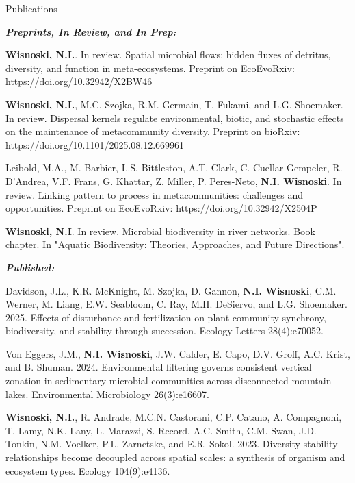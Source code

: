\documentclass{resume} %
\begin{document}
\begin{rSection}{Publications}

{\bf \em Preprints, In Review, and In Prep:}
\begin{etaremune}

\item {\bf Wisnoski, N.I.}. In review. Spatial microbial flows: hidden fluxes of detritus, diversity, and function in meta-ecosystems. Preprint on EcoEvoRxiv: https://doi.org/10.32942/X2BW46 

\item {\bf Wisnoski, N.I.}, M.C. Szojka, R.M. Germain, T. Fukami, and L.G. Shoemaker. In review. Dispersal kernels regulate environmental, biotic, and stochastic effects on the maintenance of metacommunity diversity. Preprint on bioRxiv: https://doi.org/10.1101/2025.08.12.669961 

\item Leibold, M.A., M. Barbier, L.S. Bittleston, A.T. Clark, C. Cuellar-Gempeler, R. D'Andrea, V.F. Frans, G. Khattar, Z. Miller, P. Peres-Neto, {\bf N.I. Wisnoski}. In review. Linking pattern to process in metacommunities: challenges and opportunities. Preprint on EcoEvoRxiv: https://doi.org/10.32942/X2504P 

\item {\bf Wisnoski, N.I}. In review. Microbial biodiversity in river networks. Book chapter. In "Aquatic Biodiversity: Theories, Approaches, and Future Directions".

\end{etaremune}

\smallskip
{\bf\em Published:}

\begin{etaremune}
\item Davidson, J.L., K.R. McKnight, M. Szojka, D. Gannon, {\bf N.I. Wisnoski}, C.M. Werner, M. Liang, E.W. Seabloom, C. Ray, M.H. DeSiervo, and L.G. Shoemaker. 2025. Effects of disturbance and fertilization on plant community synchrony, biodiversity, and stability through succession. Ecology Letters 28(4):e70052. 

\item Von Eggers, J.M., {\bf N.I. Wisnoski}, J.W. Calder, E. Capo, D.V. Groff, A.C. Krist, and B. Shuman. 2024. Environmental filtering governs consistent vertical zonation in sedimentary microbial communities across disconnected mountain lakes. Environmental Microbiology 26(3):e16607. 

\item {\bf Wisnoski, N.I.}, R. Andrade, M.C.N. Castorani, C.P. Catano, A. Compagnoni, T. Lamy, N.K. Lany, L. Marazzi, S. Record, A.C. Smith, C.M. Swan, J.D. Tonkin, N.M. Voelker, P.L. Zarnetske, and E.R. Sokol. 2023. Diversity-stability relationships become decoupled across spatial scales: a synthesis of organism and ecosystem types. Ecology 104(9):e4136.


\end{etaremune}
\end{rSection}
\end{document}
